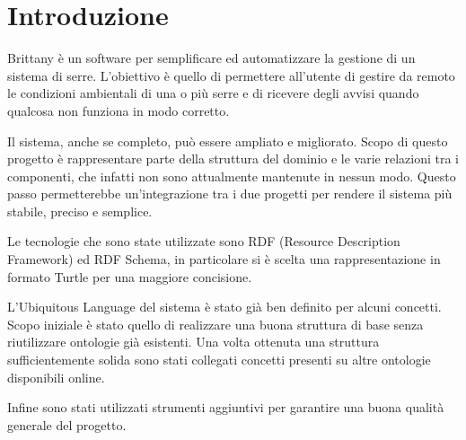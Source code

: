 \section{Introduzione}
Brittany è un software per semplificare ed automatizzare la gestione di un sistema di serre. L'obiettivo è quello di permettere all'utente di gestire da remoto le condizioni ambientali di una o più serre e di ricevere degli avvisi quando qualcosa non funziona in modo corretto.\newline

\noindent Il sistema, anche se completo, può essere ampliato e migliorato. Scopo di questo progetto è rappresentare parte della struttura del dominio e le varie relazioni tra i componenti, che infatti non sono attualmente mantenute in nessun modo. Questo passo permetterebbe un'integrazione tra i due progetti per rendere il sistema più stabile, preciso e semplice.\newline

\noindent Le tecnologie che sono state utilizzate sono RDF (Resource Description Framework) ed RDF Schema, in particolare si è scelta una rappresentazione in formato Turtle per una maggiore concisione.\newline

\noindent L'Ubiquitous Language del sistema è stato già ben definito per alcuni concetti. Scopo iniziale è stato quello di realizzare una buona struttura di base senza riutilizzare ontologie già esistenti. Una volta ottenuta una struttura sufficientemente solida sono stati collegati concetti presenti su altre ontologie disponibili online.\newline

\noindent Infine sono stati utilizzati strumenti aggiuntivi per garantire una buona qualità generale del progetto.